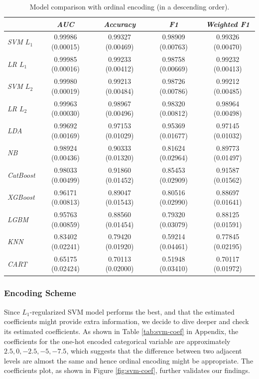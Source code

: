 \documentclass[11pt]{article}
\begin{document}
\begin{table}[H]
    \centering
    \begin{tabular}{l|c c c c}
        \hline\hline
          & \textsl{AUC} & \textsl{Accuracy} & \textsl{F1} & \textsl{Weighted F1}\\
        \hline
        \textsl{SVM $L_1$} & 0.99986 (0.00015) & 0.99327 (0.00469) & 0.98909 (0.00763) & 0.99326 (0.00470) \\
        \hline
        \textsl{LR $L_1$} & 0.99985 (0.00016) & 0.99233 (0.00412) & 0.98758 (0.00669) & 0.99232 (0.00413)  \\
        \hline
        \textsl{SVM $L_2$} & 0.99980 (0.00019) & 0.99213 (0.00484) & 0.98726 (0.00786) & 0.99212 (0.00485) \\
        \hline
        \textsl{LR $L_2$} & 0.99963 (0.00030) & 0.98967 (0.00496) & 0.98320 (0.00812) & 0.98964 (0.00498) \\
        \hline
        \textsl{LDA} & 0.99692 (0.00169) & 0.97153 (0.01029) & 0.95369 (0.01677) & 0.97145 (0.01032)\\
        \hline
        \textsl{NB} & 0.98924 (0.00436) & 0.90333 (0.01320) & 0.81624 (0.02964) & 0.89773 (0.01497) \\
        \hline
        \textsl{CatBoost} &0.98033 (0.00499) & 0.91860 (0.01452) & 0.85453 (0.02909) & 0.91587 (0.01562) \\
        \hline
        \textsl{XGBoost} & 0.96171 (0.00813) & 0.89047 (0.01543) & 0.80516 (0.02990) & 0.88697 (0.01641)  \\
        \hline
        \textsl{LGBM} & 0.95763 (0.00859) & 0.88560 (0.01454) & 0.79320 (0.03079) & 0.88125 (0.01591) \\
        \hline
        \textsl{KNN} & 0.83402 (0.02241) & 0.79420 (0.01920) & 0.59214 (0.04461) & 0.77845 (0.02195) \\
        \hline
        \textsl{CART} & 0.65175 (0.02424) & 0.70113 (0.02000) & 0.51948 (0.03410) & 0.70117 (0.01972) \\
        \hline\hline
    \end{tabular}
    \caption{Model comparison with ordinal encoding (in a descending order).}
    \label{tab:model-comparison-ordinal}
\end{table}

\subsubsection{Encoding Scheme}
Since $L_1$-regularized SVM model performs the best, and that the estimated coefficients might provide extra information, we decide to dive deeper and check its estimated coefficients. As shown in Table \ref{tab:svm-coef} in Appendix, the coefficients for the one-hot encoded categorical variable are approximately $2.5, 0, -2.5, -5, -7.5$, which suggests that the difference between two adjacent levels are almost the same and hence ordinal encoding might be appropriate. The coefficients plot, as shown in Figure \ref{fig:svm-coef}, further validates our findings.
\end{document}
